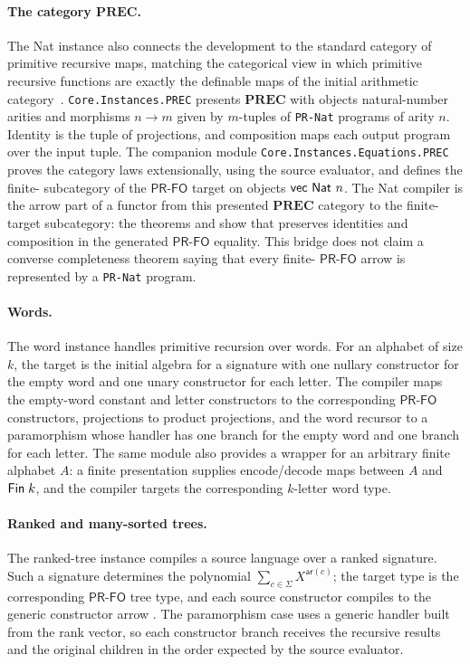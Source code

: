 \documentclass[sigplan,10pt,anonymous,review,screen]{acmart}
\newcommand{\PRFO}{\ensuremath{\mathsf{PR\mbox{-}FO}}}
\newcommand{\AgdaFile}[1]{\texttt{#1}}
\begin{document}
\paragraph{The category \(\mathbf{PREC}\).}
The Nat instance also connects the development to the standard
category of primitive recursive maps, matching the categorical view in
which primitive recursive functions are exactly the definable maps of
the initial arithmetic category~\cite{ye2026:_categ_struct_coher_theor_arith}.
\AgdaFile{Core.Instances.PREC} presents \(\mathbf{PREC}\) with objects
natural-number arities and morphisms \(n \to m\) given by \(m\)-tuples
of \AgdaFile{PR-Nat} programs of arity \(n\).  Identity is the tuple of
projections, and composition maps each output program over the input
tuple.  The companion module \AgdaFile{Core.Instances.Equations.PREC}
proves the category laws extensionally, using the source evaluator, and
defines the finite- subcategory of the \PRFO{} target
on objects \(\AgdaFunction{vec}\ \AgdaFunction{Nat}\ n\).  The Nat
compiler is the arrow part of a functor from this presented
\(\mathbf{PREC}\) category to the finite- target
subcategory: the theorems  and
 show that 
preserves identities and composition in the generated \PRFO{} equality.
This bridge does not claim a converse completeness theorem saying that
every finite- \PRFO{} arrow is represented by a
\AgdaFile{PR-Nat} program.

\paragraph{Words.}
The word instance handles primitive recursion over words.  For an
alphabet of size \(k\), the target is the initial algebra for a signature
with one nullary constructor for the empty word and one unary constructor
for each letter.  The compiler maps the empty-word constant and letter
constructors to the corresponding \PRFO{} constructors, projections to
product projections, and the word recursor to a paramorphism whose
handler has one branch for the empty word and one branch for each letter.
The same module also provides a wrapper for an arbitrary finite alphabet
\(A\): a finite presentation supplies encode/decode maps between \(A\)
and \(\AgdaDatatype{Fin}\;k\), and the compiler targets the corresponding
\(k\)-letter word type.

\paragraph{Ranked and many-sorted trees.}
The ranked-tree instance compiles a source language over a ranked
signature.  Such a signature determines the polynomial
\(\sum_{c\in\Sigma} X^{\mathsf{ar}(c)}\); the target type is the
corresponding \PRFO{} tree type, and each source constructor compiles to
the generic constructor arrow .  The paramorphism case
uses a generic handler built from the rank vector, so each constructor
branch receives the recursive results and the original children in the
order expected by the source evaluator.
\end{document}

